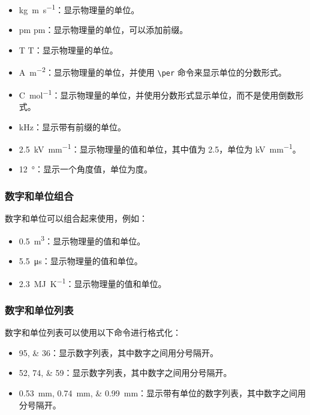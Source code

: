 \begin{itemize}
  \item \si{kg.m.s^{-1}}：显示物理量的单位。
  \item \si{\pico\meter} $\si{\pico\meter}$：显示物理量的单位，可以添加前缀。
  \item \si{\tesla} $\si{\tesla}$：显示物理量的单位。
  \item \si{\ampere\per\meter\squared}：显示物理量的单位，并使用 \verb|\per| 命令来显示单位的分数形式。
  \item \si[per-mode=fraction]{\coulomb\per\mole}：显示物理量的单位，并使用分数形式显示单位，而不是使用倒数形式。
  \item \si{\kilo\hertz}：显示带有前缀的单位。
  \item \SI{2.5}{\kilo\volt\per\milli\meter}：显示物理量的值和单位，其中值为 2.5，单位为 \si{\kilo\volt\per\milli\meter}。
  \item \SI{12}{\degree}：显示一个角度值，单位为度。
\end{itemize}

\subsubsection*{数字和单位组合}

数字和单位可以组合起来使用，例如：

\begin{itemize}
  \item \SI{0.5}{\metre\cubed}：显示物理量的值和单位。
  \item \SI{5.5}{\micro\second}：显示物理量的值和单位。
  \item \SI{2.3}{\mega\joule\per\kelvin}：显示物理量的值和单位。
\end{itemize}

\subsubsection*{数字和单位列表}

数字和单位列表可以使用以下命令进行格式化：

\begin{itemize}
  \item \numlist{95;36}：显示数字列表，其中数字之间用分号隔开。
  \item \numlist{52;74;59}：显示数字列表，其中数字之间用分号隔开。
  \item \SIlist{0.53;0.74;0.99}{\milli\metre}：显示带有单位的数字列表，其中数字之间用分号隔开。
\end{itemize}

